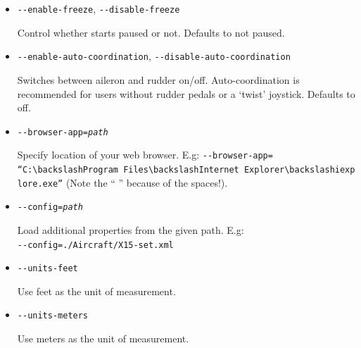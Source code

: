 {\begin{itemize}
    Enable or disable saving of user-preferences on exit from the simulator.

  \item{\texttt{-$ $-enable-freeze}, \texttt{-$ $-disable-freeze}}

    Control whether \FlightGear{} starts paused or not. Defaults to not paused.

  \item{\texttt{-$ $-enable-auto-coordination}, \texttt{-$ $-disable-auto-coordination}}

    Switches  between aileron and rudder on/off. Auto-coordination
    is recommended for users without rudder pedals or a `twist' joystick. Defaults to off.

  \item{\texttt{-$ $-browser-app={\it path}}}

    Specify location of your web browser. E.g:
    \texttt{-$ $-browser-app=}\\
    \texttt{``C:$\backslash$Program~Files$\backslash$Internet~Explorer$\backslash$iexplore.exe''}
    (Note the `` '' because of the spaces!).

  \item{\texttt{-$ $-config={\it path}}}

    Load additional properties from the given path. E.g:\\
    \texttt{-$ $-config=./Aircraft/X15-set.xml}

  \item{\texttt{-$ $-units-feet}}

    Use feet as the unit of measurement.

  \item{\texttt{-$ $-units-meters}}

    Use meters as the unit of measurement.

  \end{itemize}
}


